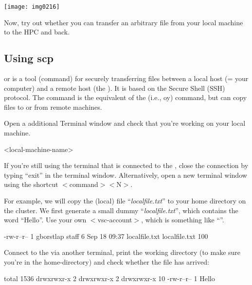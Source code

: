   \texttt{[image: img0216]}

  Now, try out whether you can transfer an arbitrary file from your local
  machine to the HPC and back.

\fi

\ifmacORlinux
  \subsection{Using scp}

   or  is a tool (command) for securely
  transferring files between a local host (= your computer) and a remote host
  (the \hpc). It is based on the Secure Shell (SSH) protocol.  The 
  command is the equivalent of the   (i.e., oy)
  command, but can copy files to or from remote machines.

  Open a additional Terminal window and check that you're working on your local
  machine.

  \begin{prompt}
  <local-machine-name>
  \end{prompt}

  If you're still using the terminal that is connected to the \hpc, close the
  connection by typing ``exit'' in the terminal window. Alternatively, open a new
  terminal window using the shortcut $<$command$>$$<$N$>$.

  For example, we will copy the (local) file ``\emph{localfile.txt}'' to your
  home directory on the \hpc cluster. We first generate a small dummy
  ``\emph{localfile.txt}'', which contains the word ``Hello''.  Use your own
  $<$vsc-account$>$, which is something like ``\emph{\userid}''.

  \begin{prompt}
  -rw-r--r-- 1 gborstlap  staff   6 Sep 18 09:37 localfile.txt
  localfile.txt    100%
  \end{prompt}

  Connect to the \hpc via another terminal, print the working directory (to make
  sure you're in the home-directory) and check whether the file has arrived:

  \begin{prompt}
  total 1536
  drwxrwxr-x  2 %
  drwxrwxr-x  2 %
  drwxrwxr-x 10 %
  -rw-r--r--  1 %
  Hello
  \end{prompt}

